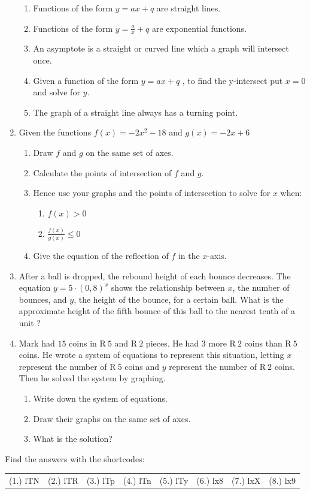 \begin{enumerate}[noitemsep, label=\textbf{\arabic*}. ]
\begin{enumerate}[noitemsep, label=\textbf{\alph*}. ]
    \item Functions of the form $y=ax+q$ are straight lines.
    \item Functions of the form $y=\frac{a}{x}+q$ are exponential functions.
    \item  An asymptote is a straight or curved line which a graph will intersect once.
    \item Given a function of the form $y=ax+q$ , to find the y-intersect put $x=0$ and solve for $y$.
    \item The graph of a straight line always has a turning point.
    \end{enumerate}
\item Given the functions $f(x)=-2{x}^{2}-18$ and $g(x)=-2x+6$
    \begin{enumerate}[noitemsep, label=\textbf{\alph*}. ] 
    \item Draw $f$ and $g$ on the same set of axes.
    \item Calculate the points of intersection of $f$ and $g$.
    \item Hence use your graphs and the points of intersection to solve for $x$ when:
	\begin{enumerate}[noitemsep, label=\textbf{\roman*}. ] 
	\item $f(x)>0$
	\item $\frac{f(x)}{g(x)}\le 0$
	\end{enumerate}
    \item Give the equation of the reflection of $f$ in the $x$-axis.
    \end{enumerate}
\item After a ball is dropped, the rebound height of each bounce decreases. The equation $y=5\ensuremath{\cdot}{(0,8)}^{x}$ shows the relationship between $x$, the number of bounces, and $y$, the height of the bounce, for a certain ball. What is the approximate height of the fifth bounce of this ball to the nearest tenth of a unit ?\newline
\item Mark had $15$ coins in R$~5$ and R$~2$ pieces. He had $3$ more R$~2$ coins than R$~5$ coins. He wrote a system of equations to represent this situation, letting $x$ represent the number of R$~5$ coins and $y$ represent the number of R$~2$ coins. Then he solved the system by graphing.
    \begin{enumerate}[noitemsep, label=\textbf{\alph*}. ] 
    \item Write down the system of equations.
    \item Draw their graphs on the same set of axes.
    \item What is the solution?
    \end{enumerate}

\end{enumerate}

\par {} Find the answers with the shortcodes:
\par \begin{tabular}[h]{cccccc}
(1.) lTN  &  (2.) lTR  &  (3.) lTp  &  (4.) lTn  &  (5.) lTy  &  (6.) lx8  &  (7.) lxX  &  (8.) lx9  & \end{tabular}
